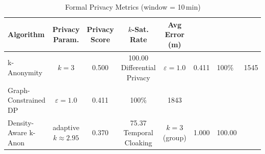\begin{table}[t]
\centering
\caption{Formal Privacy Metrics (window = 10\,min)}
\label{tab:privacy}
\begin{tabular}{lcccc}
\toprule
Algorithm & Privacy Param. & Privacy Score & $k$-Sat. Rate & Avg Error (m) \\
\midrule
  k-Anonymity & $k=3$ & 0.500 & 100.00%
  Differential Privacy & $\varepsilon=1.0$ & 0.411 & 100\% & 1545 \\
  Graph-Constrained DP & $\varepsilon=1.0$ & 0.411 & 100\% & 1843 \\
  Density-Aware k-Anon & adaptive $k\approx2.95$ & 0.370 & 75.37%
  Temporal Cloaking & $k=3$ (group) & 1.000 & 100.00%
\bottomrule
\end{tabular}
\end{table}
